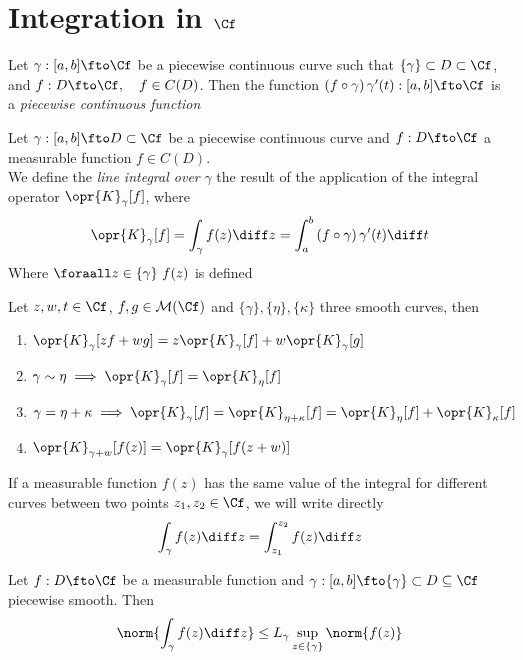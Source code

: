 \documentclass[../mmf.tex]{subfiles}
\begin{document}
\section{Integration in $\Cf$}
\begin{dfn}
	Let $\gamma:[a,b]\fto\Cf$ be a piecewise continuous curve such that $\{\gamma\}\subset D\subset\Cf$, and $f:D\fto\Cf,\quad f\in C(D)$. Then the function $\left( f\circ\gamma \right)\gamma'(t):[a,b]\fto\Cf$ is a \textit{piecewise continuous function}
\end{dfn}
\begin{dfn}
	Let $\gamma:[a,b]\fto D\subset\Cf$ be a piecewise continuous curve and $f:D\fto\Cf$ a measurable function $f\in C(D)$.\\
	We define the \textit{line integral over }$\gamma$ the result of the application of the integral operator $\opr{K}_\gamma[f]$, where
	\begin{equation}
		\opr{K}_\gamma[f]=\int_{\gamma}^{}f(z)\diff z=\int_{a}^{b}\left( f\circ\gamma \right)\gamma'(t)\diff t
		\label{eq:lineintcf}
	\end{equation}
	Where $\foraall z\in\{\gamma\}\ f(z)$ is defined
\end{dfn}
\begin{thm}
	Let $z,w,t\in\Cf$, $f,g\in\mathcal{M}(\Cf)$ and $\{\gamma\},\{\eta\},\{\kappa\}$ three smooth curves, then
	\begin{enumerate}
	\item $\opr{K}_\gamma[zf+wg]=z\opr{K}_\gamma[f]+w\opr{K}_\gamma[g]$
	\item $\gamma\sim\eta\implies{}\opr{K}_\gamma[f]=\opr{K}_\eta[f]$
	\item $\gamma=\eta+\kappa\implies{}\opr{K}_{\gamma}[f]=\opr{K}_{\eta+\kappa}[f]=\opr{K}_\eta[f]+\opr{K}_\kappa[f]$
	\item $\opr{K}_{\gamma+w}[f(z)]=\opr{K}_\gamma[f(z+w)]$
	\end{enumerate}
\end{thm}
\begin{ntn}
	If a measurable function $f(z)$ has the same value of the integral for different curves between two points $z_1,z_2\in\Cf$, we will write directly
	\begin{equation*}
		\int_{\gamma}^{}f(z)\diff z=\int_{z_1}^{z_2}f(z)\diff z
	\end{equation*}
\end{ntn}
\begin{thm}
	Let $f:D\fto\Cf$ be a measurable function and $\gamma:[a,b]\fto\{\gamma\}\subset D\subseteq\Cf$ piecewise smooth. Then
	\begin{equation*}
		\norm{\int_{\gamma}^{}f(z)\diff z}\le L_\gamma\sup_{z\in\{\gamma\}}\norm{f(z)}
	\end{equation*}
\end{thm}
\end{document}
